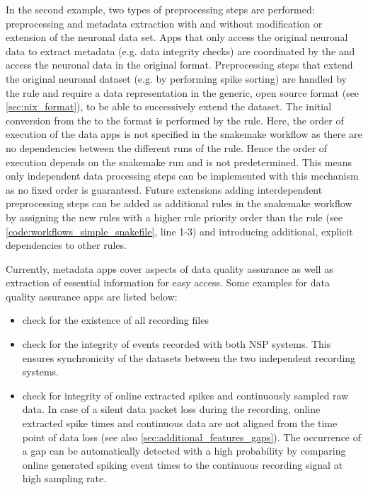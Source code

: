 In the second example, two types of preprocessing steps are performed: preprocessing and metadata extraction with and without modification or extension of the neuronal data set. Apps that only access the original neuronal data to extract metadata (e.g. data integrity checks) are coordinated by the  and access the neuronal data in the original  format. Preprocessing steps that extend the original neuronal dataset (e.g. by performing spike sorting) are handled by the  rule and require a data representation in the generic, open source  format (see \cref{sec:nix_format}), to be able to successively extend the dataset. The initial conversion from the  to the  format is performed by the  rule. Here, the order of execution of the data apps is not specified in the snakemake workflow as there are no dependencies between the different runs of the  rule. Hence the order of execution depends on the snakemake run and is not predetermined. This means only independent data processing steps can be implemented with this mechanism as no fixed order is guaranteed. Future extensions adding interdependent preprocessing steps can be added as additional rules in the snakemake workflow by assigning the new rules with a higher rule priority order than the  rule (see \cref{code:workflows_simple_snakefile}, line 1-3) and introducing additional, explicit dependencies to other rules.

Currently, metadata apps cover aspects of data quality assurance as well as extraction of essential information for easy access. Some examples for data quality assurance apps are listed below:
\begin{itemize}
 \item check for the existence of all recording files
 \item check for the integrity of events recorded with both NSP systems. This ensures synchronicity of the datasets between the two independent  recording systems.
 \item check for integrity of online extracted spikes and continuously sampled raw data. In case of a silent data packet loss during the recording, online extracted spike times and continuous data are not aligned from the time point of data loss (see also \cref{sec:additional_features_gaps}). The occurrence of a gap can be automatically detected with a high probability by comparing online generated spiking event times to the continuous recording signal at high sampling rate.
\end{itemize}

